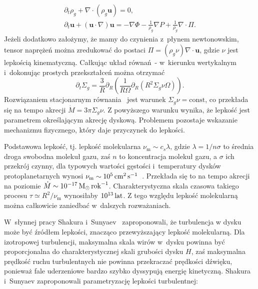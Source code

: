 \begin{gather}
   \partial_t \rho_g + \nabla\cdot\left(\rho_g\mathbf{u}\right) = 0,
   \label{eq:ns1}\\
\partial_t \mathbf{u} + \left(\mathbf{u}\cdot\nabla\right)\mathbf{u} = 
-\nabla\Phi -\frac{1}{\rho_g} \nabla P + \frac{1}{\rho_g} \nabla \cdot \Pi.
\label{eq:ns2}
\end{gather}
%
Jeżeli dodatkowo założymy, że mamy do czynienia z~płynem newtonowskim, tensor
naprężeń można zredukować do postaci $\Pi = (\rho_g \nu)\nabla\cdot\mathbf{u}$,
gdzie $\nu$ jest lepkością kinematyczną. Całkując układ
równań~- w~kierunku wertykalnym i~dokonując prostych
przekształceń można otrzymać
\begin{equation}\label{eq:sigma}
   \partial_t \Sigma_g =
   \frac{3}{R}\partial_R\left(\frac{1}{R\Omega}\partial_R\left(R^2\Sigma_g \nu
         \Omega\right)\right).
\end{equation}
Rozwiązaniem stacjonarnym równania~ jest warunek $\Sigma_g\nu =
\textrm{const}$, co przekłada się na tempo akrecji $\dot{M} = 3\pi\Sigma_g\nu$.
Z powyższego warunku wynika, że lepkość jest parametrem określającym akrecję
dyskową. Problemem pozostaje wskazanie mechanizmu fizycznego, który daje
przyczynek do lepkości.
\par Podstawowa lepkość, tj. lepkość molekularna $\nu_{\textrm{m}} \sim c_s
\lambda$, gdzie $\lambda = 1 / n\sigma$ to średnia droga swobodna molekuł gazu,
zaś $n$ to koncentracja molekuł gazu, a $\sigma$ ich przekrój czynny, dla
typowych wartości gęstości i~temperatury dysków protoplanetarnych wynosi
$\nu_{\textrm{m}}\sim10^5\hbox{$\thinspace\textrm{cm}$}^2\hbox{$\thinspace\textrm{s}$}^{-1}$~\cite{armitage}. Przekłada się to na
tempo akrecji na poziomie $\dot{M}\sim 10^{-17}\hbox{$\mathrm{\thinspace M_{\odot}}$}\hbox{$\thinspace\textrm{rok}$}^{-1}$. 
Charakterystyczna skala czasowa takiego procesu $\tau \simeq R^2 /
\nu_{\textrm{m}}$ wynosiłaby $10^{13}\hbox{$\thinspace\textrm{lat}$}$. Z tego względu lepkość molekularną można
całkowicie zaniedbać w~dalszych rozważaniach.
\par W~słynnej pracy Shakura i~Sunyaev~\citep{SS73} zaproponowali, że turbulencja
w dysku może być źródłem lepkości, znacząco przewyższający
lepkość molekularną. Dla izotropowej turbulencji, maksymalna skala wirów w~dysku
powinna być proporcjonalna do charakterystycznej skali grubości dysku $H$, zaś
maksymalna prędkość ruchu turbulentnych nie powinna przekraczać prędkości
dźwięku, ponieważ fale uderzeniowe bardzo szybko dyssypują energię kinetyczną.
Shakura i~Sunyaev zaproponowali parametryzację lepkości turbulentnej:

